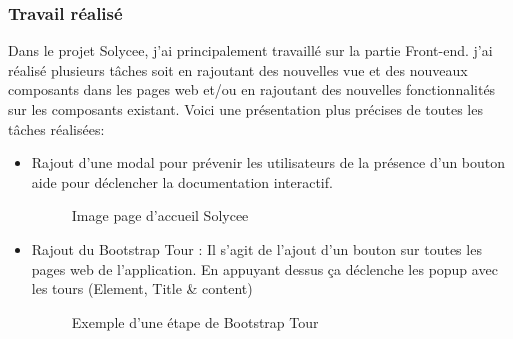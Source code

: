 \documentclass[a4paper]{article}
\begin{document}
\subsubsection{Travail réalisé}

Dans le projet Solycee, j'ai principalement travaillé sur la partie Front-end. j'ai réalisé plusieurs tâches soit en rajoutant des nouvelles vue et des nouveaux composants dans les pages web et/ou en rajoutant des nouvelles fonctionnalités sur les composants existant. Voici une présentation plus précises de toutes les tâches réalisées: 
\begin{itemize}
\item Rajout d'une modal pour prévenir les utilisateurs de la  présence d'un bouton aide pour déclencher la documentation interactif.

\begin{figure}[H]
	\centering
  		\caption{Image page d'accueil Solycee}
	\end{figure}
   
\item Rajout du Bootstrap Tour : Il s'agit de l'ajout d'un bouton sur toutes les pages web de l'application. En appuyant dessus ça déclenche les popup avec les tours (Element, Title \& content)  

\begin{figure}[H]
	\centering
  		\caption{Exemple d'une étape de Bootstrap Tour}
	\end{figure}
\end{itemize} 
\end{document}
